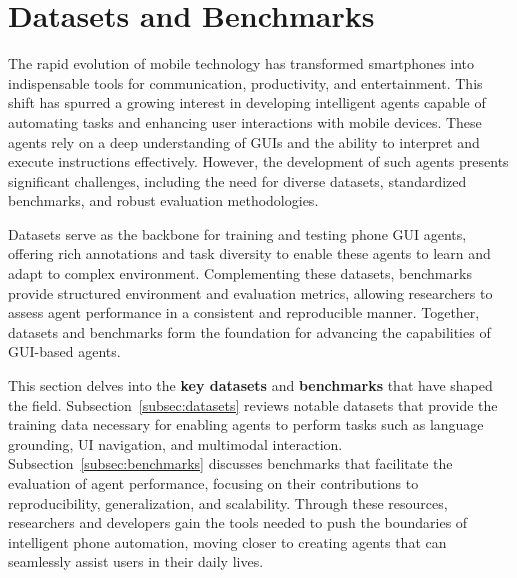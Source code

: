 \section{Datasets and Benchmarks}
\label{sec:datasets_and_benchmarks}

The rapid evolution of mobile technology has transformed smartphones into indispensable tools for communication, productivity, and entertainment. This shift has spurred a growing interest in developing intelligent agents capable of automating tasks and enhancing user interactions with mobile devices. These agents rely on a deep understanding of GUIs and the ability to interpret and execute instructions effectively. However, the development of such agents presents significant challenges, including the need for diverse datasets, standardized benchmarks, and robust evaluation methodologies.

Datasets serve as the backbone for training and testing phone GUI agents, offering rich annotations and task diversity to enable these agents to learn and adapt to complex environment. Complementing these datasets, benchmarks provide structured environment and evaluation metrics, allowing researchers to assess agent performance in a consistent and reproducible manner. Together, datasets and benchmarks form the foundation for advancing the capabilities of GUI-based agents.

This section delves into the \textbf{key datasets} and \textbf{benchmarks} that have shaped the field. Subsection~\ref{subsec:datasets} reviews notable datasets that provide the training data necessary for enabling agents to perform tasks such as language grounding, UI navigation, and multimodal interaction. Subsection~\ref{subsec:benchmarks} discusses benchmarks that facilitate the evaluation of agent performance, focusing on their contributions to reproducibility, generalization, and scalability. Through these resources, researchers and developers gain the tools needed to push the boundaries of intelligent phone automation, moving closer to creating agents that can seamlessly assist users in their daily lives.

